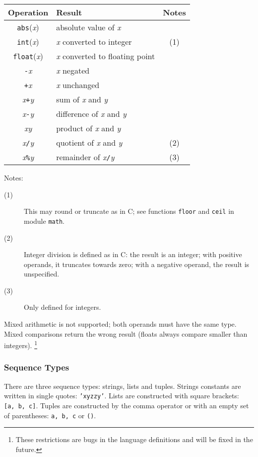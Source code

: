 \begin{center}
\begin{tabular}{|c|l|c|}
\hline
Operation & Result & Notes \\
\hline
{\tt abs}({\em x}) & absolute value of {\em x} & \\
{\tt int}({\em x}) & {\em x} converted to integer & (1) \\
{\tt float}({\em x}) & {\em x} converted to floating point & \\
{\tt -}{\em x} & {\em x} negated & \\
{\tt +}{\em x} & {\em x} unchanged & \\
{\em x}{\tt +}{\em y} & sum of {\em x} and {\em y} & \\
{\em x}{\tt -}{\em y} & difference of {\em x} and {\em y} & \\
{\em x}{\tt *}{\em y} & product of {\em x} and {\em y} & \\
{\em x}{\tt /}{\em y} & quotient of {\em x} and {\em y} & (2) \\
{\em x}{\tt \%}{\em y} & remainder of {\em x}{\tt /}{\em y} & (3) \\
\hline
\end{tabular}
\end{center}

\noindent
Notes:
\begin{description}
\item[(1)]
This may round or truncate as in C; see functions {\tt floor} and
{\tt ceil} in module {\tt math}.
\item[(2)]
Integer division is defined as in C: the result is an integer; with
positive operands, it truncates towards zero; with a negative operand,
the result is unspecified.
\item[(3)]
Only defined for integers.
\end{description}

Mixed arithmetic is not supported; both operands must have the same type.
Mixed comparisons return the wrong result (floats always compare smaller
than integers).%
\footnote{
These restrictions are bugs in the language definitions and will be
fixed in the future.
}
\subsubsection{Sequence Types}

There are three sequence types: strings, lists and tuples.
Strings constants are written in single quotes: {\tt 'xyzzy'}.
Lists are constructed with square brackets: {\tt [a,~b,~c]}.
Tuples are constructed by the comma operator or with an empty set of
parentheses: {\tt a,~b,~c} or {\tt ()}.

